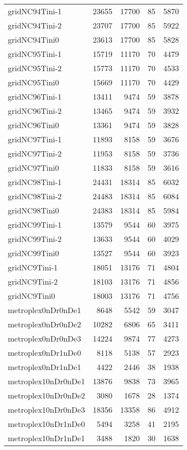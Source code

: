 \begin{tabular}{lrrrr}
gridNC94Tini-1 & 23655 & 17700 & 85 & 5870 \\
gridNC94Tini-2 & 23707 & 17700 & 85 & 5922 \\
gridNC94Tini0 & 23613 & 17700 & 85 & 5828 \\
gridNC95Tini-1 & 15719 & 11170 & 70 & 4479 \\
gridNC95Tini-2 & 15773 & 11170 & 70 & 4533 \\
gridNC95Tini0 & 15669 & 11170 & 70 & 4429 \\
gridNC96Tini-1 & 13411 & 9474 & 59 & 3878 \\
gridNC96Tini-2 & 13465 & 9474 & 59 & 3932 \\
gridNC96Tini0 & 13361 & 9474 & 59 & 3828 \\
gridNC97Tini-1 & 11893 & 8158 & 59 & 3676 \\
gridNC97Tini-2 & 11953 & 8158 & 59 & 3736 \\
gridNC97Tini0 & 11833 & 8158 & 59 & 3616 \\
gridNC98Tini-1 & 24431 & 18314 & 85 & 6032 \\
gridNC98Tini-2 & 24483 & 18314 & 85 & 6084 \\
gridNC98Tini0 & 24383 & 18314 & 85 & 5984 \\
gridNC99Tini-1 & 13579 & 9544 & 60 & 3975 \\
gridNC99Tini-2 & 13633 & 9544 & 60 & 4029 \\
gridNC99Tini0 & 13527 & 9544 & 60 & 3923 \\
gridNC9Tini-1 & 18051 & 13176 & 71 & 4804 \\
gridNC9Tini-2 & 18103 & 13176 & 71 & 4856 \\
gridNC9Tini0 & 18003 & 13176 & 71 & 4756 \\
metroplex0nDr0nDe1 & 8648 & 5542 & 59 & 3047 \\
metroplex0nDr0nDe2 & 10282 & 6806 & 65 & 3411 \\
metroplex0nDr0nDe3 & 14224 & 9874 & 77 & 4273 \\
metroplex0nDr1nDe0 & 8118 & 5138 & 57 & 2923 \\
metroplex0nDr1nDe1 & 4422 & 2446 & 38 & 1938 \\
metroplex10nDr0nDe1 & 13876 & 9838 & 73 & 3965 \\
metroplex10nDr0nDe2 & 3080 & 1678 & 28 & 1374 \\
metroplex10nDr0nDe3 & 18356 & 13358 & 86 & 4912 \\
metroplex10nDr1nDe0 & 5494 & 3258 & 41 & 2195 \\
metroplex10nDr1nDe1 & 3488 & 1820 & 30 & 1638 \\

\end{tabular}
